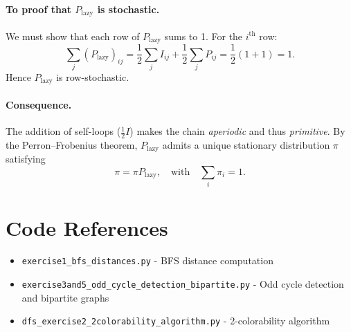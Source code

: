 \documentclass[12pt,a4paper]{article}
\begin{document}
\paragraph{To proof that \(P_{\text{lazy}}\) is stochastic.}
We must show that each row of \( P_{\text{lazy}} \) sums to 1.  
For the \( i^{\text{th}} \) row:
\[
\sum_{j}(P_{\text{lazy}})_{ij}
= \frac{1}{2}\sum_{j}I_{ij} + \frac{1}{2}\sum_{j}P_{ij}
= \frac{1}{2}(1 + 1) = 1.
\]
Hence \( P_{\text{lazy}} \) is row-stochastic.

\paragraph{Consequence.}
The addition of self-loops (\( \frac{1}{2}I \)) makes the chain \emph{aperiodic} and thus \emph{primitive}.  
By the Perron–Frobenius theorem, \( P_{\text{lazy}} \) admits a unique stationary distribution \( \pi \) satisfying
\[
\pi = \pi P_{\text{lazy}}, \quad \text{with} \quad \sum_i \pi_i = 1.
\]










\section{Code References}

\begin{itemize}
    \item \texttt{exercise1\_bfs\_distances.py} - BFS distance computation
    \item \texttt{exercise3and5\_odd\_cycle\_detection\_bipartite.py} - Odd cycle detection and bipartite graphs
    \item \texttt{dfs\_exercise2\_2colorability\_algorithm.py} - 2-colorability algorithm
\end{itemize}
\end{document}
